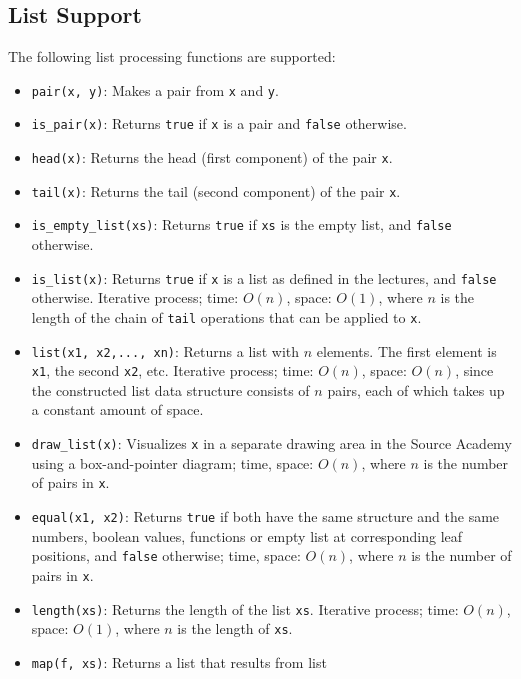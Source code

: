 \subsection*{List Support}

The following list processing functions are supported:

\begin{itemize}
\item \lstinline{pair(x, y)}: Makes a pair from \lstinline{x} and \lstinline{y}.
\item \lstinline{is_pair(x)}: Returns \lstinline{true} if \lstinline{x} is a
  pair and \lstinline{false} otherwise.
\item \lstinline{head(x)}: Returns the head (first component) of the pair \lstinline{x}.
\item \lstinline{tail(x)}: Returns the tail (second component) of the
  pair \lstinline{x}.
\item \lstinline{is_empty_list(xs)}: Returns \lstinline{true} if \lstinline{xs} is the
  empty list, and \lstinline{false} otherwise.
\item \lstinline{is_list(x)}: Returns \lstinline{true} if
  \lstinline{x} is a list as defined in the lectures, and
  \lstinline{false} otherwise. Iterative process; 
time: $O(n)$, space: $O(1)$, where $n$ is the length of the 
chain of \lstinline{tail} operations that can be applied to \lstinline{x}.
\item \lstinline{list(x1, x2,..., xn)}: Returns a list with $n$ elements. The
first element is \lstinline{x1}, the second \lstinline{x2}, etc. Iterative
process; time: $O(n)$, space: $O(n)$, since the constructed list data structure
consists of $n$ pairs, each of which takes up a constant amount of space.
\item \lstinline{draw_list(x)}: Visualizes \lstinline{x} in a separate drawing
  area in the Source Academy using a box-and-pointer diagram; time, space:
  $O(n)$, where $n$ is the number of pairs in \lstinline{x}.
\item \lstinline{equal(x1, x2)}: Returns \lstinline{true} if both
have the same structure and the same numbers, boolean values, functions or empty list
at corresponding leaf positions, and \lstinline{false} otherwise; time, space:
  $O(n)$, where $n$ is the number of pairs in \lstinline{x}.
\item \lstinline{length(xs)}: Returns the length of the list
  \lstinline{xs}. 
Iterative process; time: $O(n)$, space: $O(1)$, where $n$ is the length of \lstinline{xs}.
\item \lstinline{map(f, xs)}: Returns a list that results from list

\end{itemize}
